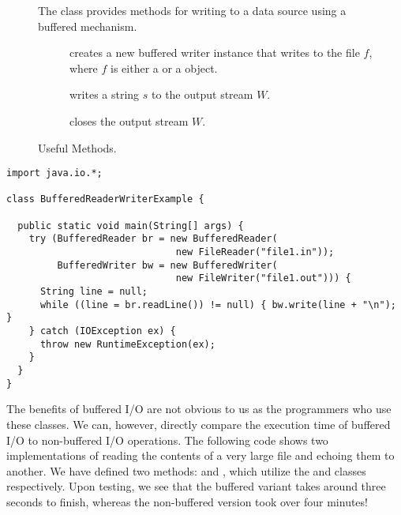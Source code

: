 \begin{figure}[tp]
  \small
  \begin{tcolorbox}[title=BufferedWriter Methods]
    The  class provides methods for writing to a data source using a buffered mechanism.
    \vspace{2ex}
  \begin{description}
    \item [] creates a new buffered writer instance that writes to the file $f$, where $f$ is either a  or a  object.
    \item [] writes a string $s$ to the output stream $W$.
    \item [] closes the output stream $W$.
  \end{description}
\end{tcolorbox}
  \caption{Useful  Methods.}
  \label{fig:bw}
\end{figure}


\begin{lstlisting}[language=MyJava]
import java.io.*;

class BufferedReaderWriterExample {

  public static void main(String[] args) {
    try (BufferedReader br = new BufferedReader(
                              new FileReader("file1.in"));
         BufferedWriter bw = new BufferedWriter(
                              new FileWriter("file1.out"))) {
      String line = null;
      while ((line = br.readLine()) != null) { bw.write(line + "\n"); }
    } catch (IOException ex) {
      throw new RuntimeException(ex);
    }
  }
}
\end{lstlisting}

The benefits of buffered I/O are not obvious to us as the programmers who use these classes. 
We can, however, directly compare the execution time of buffered I/O to non-buffered I/O operations. 
The following code shows two implementations of reading the contents of a very large file and echoing them to another. 
We have defined two methods:  and , which utilize the  and  classes respectively. 
Upon testing, we see that the buffered variant takes around three seconds to finish, whereas the non-buffered version took over four minutes!

